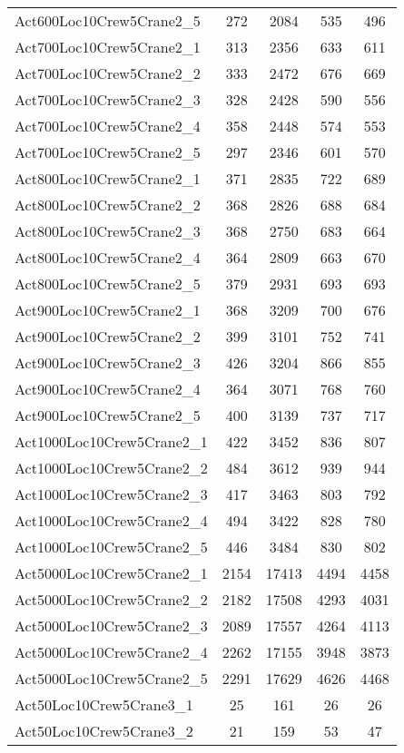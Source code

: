 \begin{center}
\begin{longtable}{ | l | c | c | c | c | }
Act600Loc10Crew5Crane2\_5	&	272	&	2084	&	535	&	496	\\
Act700Loc10Crew5Crane2\_1	&	313	&	2356	&	633	&	611	\\
Act700Loc10Crew5Crane2\_2	&	333	&	2472	&	676	&	669	\\
Act700Loc10Crew5Crane2\_3	&	328	&	2428	&	590	&	556	\\
Act700Loc10Crew5Crane2\_4	&	358	&	2448	&	574	&	553	\\
Act700Loc10Crew5Crane2\_5	&	297	&	2346	&	601	&	570	\\
Act800Loc10Crew5Crane2\_1	&	371	&	2835	&	722	&	689	\\
Act800Loc10Crew5Crane2\_2	&	368	&	2826	&	688	&	684	\\
Act800Loc10Crew5Crane2\_3	&	368	&	2750	&	683	&	664	\\
Act800Loc10Crew5Crane2\_4	&	364	&	2809	&	663	&	670	\\
Act800Loc10Crew5Crane2\_5	&	379	&	2931	&	693	&	693	\\
Act900Loc10Crew5Crane2\_1	&	368	&	3209	&	700	&	676	\\
Act900Loc10Crew5Crane2\_2	&	399	&	3101	&	752	&	741	\\
Act900Loc10Crew5Crane2\_3	&	426	&	3204	&	866	&	855	\\
Act900Loc10Crew5Crane2\_4	&	364	&	3071	&	768	&	760	\\
Act900Loc10Crew5Crane2\_5	&	400	&	3139	&	737	&	717	\\
Act1000Loc10Crew5Crane2\_1	&	422	&	3452	&	836	&	807	\\
Act1000Loc10Crew5Crane2\_2	&	484	&	3612	&	939	&	944	\\
Act1000Loc10Crew5Crane2\_3	&	417	&	3463	&	803	&	792	\\
Act1000Loc10Crew5Crane2\_4	&	494	&	3422	&	828	&	780	\\
Act1000Loc10Crew5Crane2\_5	&	446	&	3484	&	830	&	802	\\
Act5000Loc10Crew5Crane2\_1	&	2154	&	17413	&	4494	&	4458	\\
Act5000Loc10Crew5Crane2\_2	&	2182	&	17508	&	4293	&	4031	\\
Act5000Loc10Crew5Crane2\_3	&	2089	&	17557	&	4264	&	4113	\\
Act5000Loc10Crew5Crane2\_4	&	2262	&	17155	&	3948	&	3873	\\
Act5000Loc10Crew5Crane2\_5	&	2291	&	17629	&	4626	&	4468	\\ \hline
Act50Loc10Crew5Crane3\_1	&	25	&	161	&	26	&	26	\\
Act50Loc10Crew5Crane3\_2	&	21	&	159	&	53	&	47	\\

\end{longtable}
\end{center}
